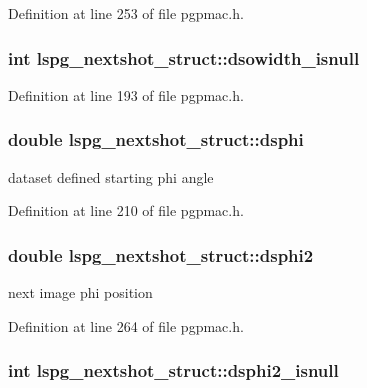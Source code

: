 Definition at line 253 of file pgpmac.\-h.

\hypertarget{structlspg__nextshot__struct_a5dd3db64790e09bc03499e521bbaa126}{
\subsubsection[{dsowidth\-\_\-isnull}]{\setlength{\rightskip}{0pt plus 5cm}int lspg\-\_\-nextshot\-\_\-struct\-::dsowidth\-\_\-isnull}}\label{structlspg__nextshot__struct_a5dd3db64790e09bc03499e521bbaa126}


Definition at line 193 of file pgpmac.\-h.

\hypertarget{structlspg__nextshot__struct_a64ebde597ca97a3b98145dc2d580c64f}{
\subsubsection[{dsphi}]{\setlength{\rightskip}{0pt plus 5cm}double lspg\-\_\-nextshot\-\_\-struct\-::dsphi}}\label{structlspg__nextshot__struct_a64ebde597ca97a3b98145dc2d580c64f}


dataset defined starting phi angle 



Definition at line 210 of file pgpmac.\-h.

\hypertarget{structlspg__nextshot__struct_a98857616b6bbb6ba861e96b6b7551756}{
\subsubsection[{dsphi2}]{\setlength{\rightskip}{0pt plus 5cm}double lspg\-\_\-nextshot\-\_\-struct\-::dsphi2}}\label{structlspg__nextshot__struct_a98857616b6bbb6ba861e96b6b7551756}


next image phi position 



Definition at line 264 of file pgpmac.\-h.

\hypertarget{structlspg__nextshot__struct_a57a9c43be86188f65b96d59c2adec674}{
\subsubsection[{dsphi2\-\_\-isnull}]{\setlength{\rightskip}{0pt plus 5cm}int lspg\-\_\-nextshot\-\_\-struct\-::dsphi2\-\_\-isnull}}\label{structlspg__nextshot__struct_a57a9c43be86188f65b96d59c2adec674}


